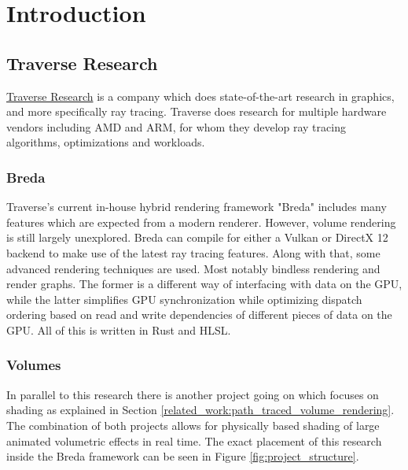 \section{Introduction} \label{introduction}



\subsection{Traverse Research} \label{introduction:traverse_research}
\href{https://traverseresearch.nl/}{Traverse Research} is a company which does state-of-the-art research in graphics, and more specifically ray tracing. Traverse does research for multiple hardware vendors including AMD and ARM, for whom they develop ray tracing algorithms, optimizations and workloads.
\subsubsection{Breda} \label{introduction:traverse_research:breda}
Traverse's current in-house hybrid rendering framework "Breda" includes many features which are expected from a modern renderer. However, volume rendering is still largely unexplored. Breda can compile for either a Vulkan or DirectX 12 backend to make use of the latest ray tracing features. Along with that, some advanced rendering techniques are used. Most notably bindless rendering\cite{BindlessRenderingSetup} and render graphs\cite{RenderGraph101}. The former is a different way of interfacing with data on the GPU, while the latter simplifies GPU synchronization while optimizing dispatch ordering based on read and write dependencies of different pieces of data on the GPU. All of this is written in Rust and HLSL.
\subsubsection{Volumes} \label{introduction:traverse_research:volumes}
In parallel to this research there is another project going on which focuses on shading as explained in Section \ref{related_work:path_traced_volume_rendering}. The combination of both projects allows for physically based shading of large animated volumetric effects in real time. The exact placement of this research inside the Breda framework can be seen in Figure \ref{fig:project_structure}.

